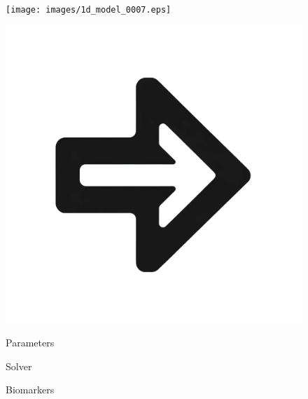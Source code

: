 \documentclass{beamer}
\begin{document}
\begin{frame}
\begin{figure}[htbp]
\begin{minipage}[c][0.35\paperheight][c]{\linewidth}
\begin{minipage}{0.1\linewidth}
			\end{minipage}
			\begin{minipage}{0.19\linewidth}
				\texttt{[image: images/1d\_model\_0007.eps]}
			\end{minipage}
			\begin{minipage}{0.1\linewidth}
				\includegraphics[width=\linewidth]{images/right_arrow.png}
			\end{minipage}
		\end{minipage}
		\begin{minipage}[t][0.06\paperheight][t]{\linewidth}
			\begin{minipage}{0.19\linewidth}
				\caption*{\tiny Parameters}
			\end{minipage}
			\begin{minipage}{0.1\linewidth}
				\caption*{\tiny}
			\end{minipage}
			\begin{minipage}{0.19\linewidth}
				\caption*{\tiny Solver}
			\end{minipage}
			\begin{minipage}{0.1\linewidth}
				\caption*{\tiny}
			\end{minipage}
			\begin{minipage}{0.19\linewidth}
				\caption*{\tiny Biomarkers}
			\end{minipage}

\end{minipage}
\end{figure}
\end{frame}
\end{document}
